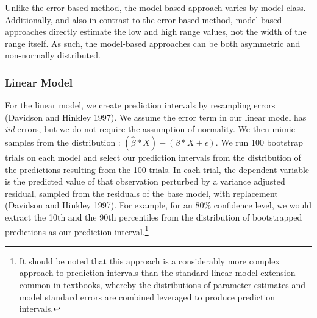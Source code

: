 \documentclass[colTwo]{anon}
\theoremstyle{definition}
\begin{document}
Unlike the error-based method, the model-based approach varies by model class. Additionally, and also in contrast to the error-based method, model-based approaches directly estimate the low and high range values, not the width of the range itself. As such, the model-based approaches can be both asymmetric and non-normally distributed.

\subsubsection{Linear Model}

For the linear model, we create prediction intervals by resampling errors (Davidson and Hinkley 1997). We assume the error term in our linear model has \textit{iid} errors, but we do not require the assumption of normality. We then mimic samples from the distribution : \((\widehat{\beta}*X) - (\beta*X + \epsilon)\). We run 100 bootstrap trials on each model and select our prediction intervals from the distribution of the predictions resulting from the 100 trials. In each trial, the dependent variable is the predicted value of that observation perturbed by a variance adjusted residual, sampled from the residuals of the base model, with replacement (Davidson and Hinkley 1997).  For example, for an 80\% confidence level, we would extract the 10th and the 90th percentiles from the distribution of bootstrapped predictions as our prediction interval.\footnote{It should be noted that this approach is a considerably more complex approach to prediction intervals than the standard linear model extension common in textbooks, whereby the distributions of parameter estimates and model standard errors are combined leveraged to produce prediction intervals.}
\end{document}
